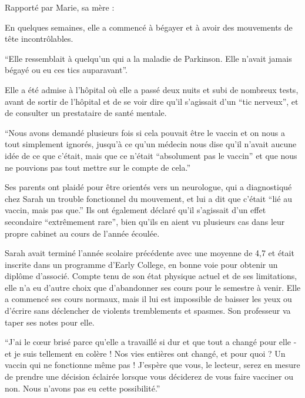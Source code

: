 Rapporté par Marie, sa mère :

En quelques semaines, elle a commencé à bégayer et à avoir des mouvements de
tête incontrôlables.

“Elle ressemblait à quelqu'un qui a la maladie de Parkinson. Elle n'avait jamais
bégayé ou eu ces tics auparavant”.

Elle a été admise à l'hôpital où elle a passé deux nuits et subi de nombreux
tests, avant de sortir de l'hôpital et de se voir dire qu'il s'agissait d'un
“tic nerveux”, et de consulter un prestataire de santé mentale.

“Nous avons demandé plusieurs fois si cela pouvait être le vaccin et on nous a
tout simplement ignorés, jusqu'à ce qu'un médecin nous dise qu'il n'avait aucune
idée de ce que c'était, mais que ce n'était “absolument pas le vaccin” et que
nous ne pouvions pas tout mettre sur le compte de cela.”

Ses parents ont plaidé pour être orientés vers un neurologue, qui a diagnostiqué
chez Sarah un trouble fonctionnel du mouvement, et lui a dit que c'était “lié au
vaccin, mais pas que.” Ils ont également déclaré qu'il s'agissait d'un effet
secondaire “extrêmement rare”, bien qu'ils en aient vu plusieurs cas dans leur
propre cabinet au cours de l'année écoulée.

Sarah avait terminé l'année scolaire précédente avec une moyenne de 4,7 et était
inscrite dans un programme d'Early College, en bonne voie pour obtenir un
diplôme d'associé. Compte tenu de son état physique actuel et de ses
limitations, elle n'a eu d'autre choix que d'abandonner ses cours pour le
semestre à venir. Elle a commencé ses cours normaux, mais il lui est impossible
de baisser les yeux ou d'écrire sans déclencher de violents tremblements et
spasmes. Son professeur va taper ses notes pour elle.

“J'ai le cœur brisé parce qu'elle a travaillé si dur et que tout a changé pour
elle - et je suis tellement en colère ! Nos vies entières ont changé, et pour
quoi ? Un vaccin qui ne fonctionne même pas ! J'espère que vous, le lecteur,
serez en mesure de prendre une décision éclairée lorsque vous déciderez de vous
faire vacciner ou non. Nous n'avons pas eu cette possibilité.”


